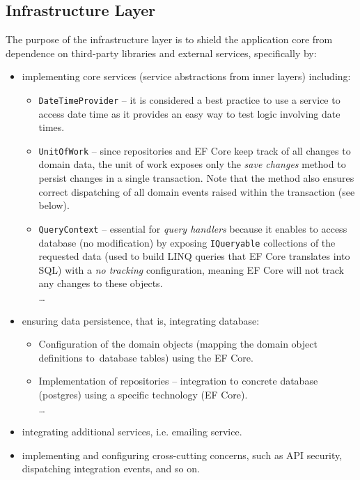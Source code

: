 \subsection{Infrastructure Layer}
\label{dev:ca:infra}
The purpose of the infrastructure layer is to shield the application core from dependence on third-party libraries and external services, specifically by:

\begin{itemize}
    \item implementing core services (service abstractions from inner layers) including:
    \begin{itemize}
        \item \texttt{DateTimeProvider} -- it is considered a best practice to use a service to access date time as it provides an easy way to test logic involving date times.
        \item \texttt{UnitOfWork} -- since repositories and EF Core keep track of all changes to domain data, the unit of work exposes only the \textit{save changes} method to persist changes in a single transaction. Note that the method also ensures correct dispatching of all domain events raised within the transaction (see below).
        \item \texttt{QueryContext} -- essential for \textit{query handlers} because it enables to access database (no modification) by exposing \texttt{IQueryable} collections of the requested data (used to build LINQ queries that EF Core translates into SQL) with a \textit{no tracking} configuration, meaning EF Core will not track any changes to these objects.
        \\\dots
    \end{itemize}
    \item ensuring data persistence, that is, integrating database:
    \begin{itemize}
        \item Configuration of the domain objects (mapping the domain object definitions to~database tables) using the EF Core.
        \item Implementation of repositories -- integration to concrete database (postgres) using a specific technology (EF Core).
        \\\dots
    \end{itemize}
    \item integrating additional services, i.e. emailing service.
    \item implementing and configuring cross-cutting concerns, such as API security, dispatching integration events, and so on.
\end{itemize}

